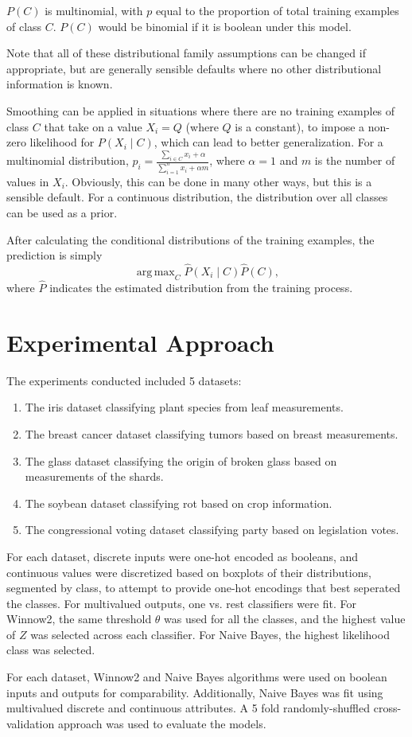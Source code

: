 \documentclass{amsart}
\DeclareMathOperator*{\argmax}{arg\,max}
\begin{document}
    $P(C)$ is multinomial, with $p$ equal to the proportion of total training
    examples of class $C$. $P(C)$ would be binomial if it is boolean under this model.

    Note that all of these distributional family assumptions can be changed if appropriate, but
    are generally sensible defaults where no other distributional information is known.

    Smoothing can be applied in situations where there are no training examples of class $C$ that take
    on a value $X_i = Q$ (where $Q$ is a constant), to impose a non-zero likelihood for $P(X_i \mid C)$,
    which can lead to better generalization.
    For a multinomial distribution, $p_i = \frac{\sum_{i \in C} x_i + \alpha}{\sum_{i=1}^n x_i + \alpha m}$,
    where $\alpha=1$ and $m$ is the number of values in $X_i$. Obviously, this can be done in many other ways,
    but this is a sensible default. For a continuous distribution, the distribution over all classes can
    be used as a prior.

    After calculating the conditional distributions of the training examples, the prediction is
    simply
    \[
        \argmax_C \hat{P}(X_i \mid C) \hat{P}(C),
    \]
    where $\hat{P}$ indicates the estimated distribution from the training process.

    \section{Experimental Approach}
    The experiments conducted included 5 datasets:
    \begin{enumerate}
        \item The iris dataset classifying plant species from leaf measurements.
        \item The breast cancer dataset classifying tumors based on breast measurements.
        \item The glass dataset classifying the origin of broken glass based on measurements of the shards.
        \item The soybean dataset classifying rot based on crop information.
        \item The congressional voting dataset classifying party based on legislation votes.
    \end{enumerate}
    For each dataset, discrete inputs were one-hot encoded as booleans, and
    continuous values were discretized based on boxplots of their distributions, segmented by class,
    to attempt to provide one-hot encodings that best seperated the classes. For multivalued outputs,
    one vs. rest classifiers were fit. For Winnow2, the same threshold $\theta$ was used for all the classes,
    and the highest value of $Z$ was selected across each classifier.
    For Naive Bayes, the highest likelihood class was selected.

    For each dataset, Winnow2 and Naive Bayes algorithms were used on boolean inputs and outputs for
    comparability. Additionally, Naive Bayes was fit using multivalued discrete and
    continuous attributes. A 5 fold randomly-shuffled cross-validation approach was used to evaluate the models.
\end{document}
